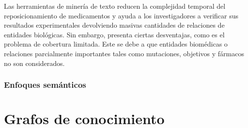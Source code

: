 Las herramientas de minería de texto reducen la complejidad temporal del reposicionamiento de medicamentos y ayuda a los investigadores a verificar sus resultados experimentales devolviendo masivas cantidades de relaciones de entidades biológicas. Sin embargo, presenta ciertas desventajas, como es el problema de cobertura limitada. Este se debe a que entidades biomédicas o relaciones parcialmente importantes tales como mutaciones, objetivos y fármacos no son considerados.

\subsubsection{Enfoques semánticos}


\section{Grafos de conocimiento}
